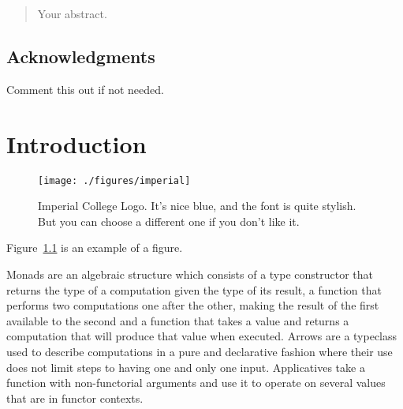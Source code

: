 \documentclass[12pt,twoside]{report}
\begin{document}



\clearpage{\pagestyle{empty}\cleardoublepage}
\setcounter{page}{1}
\pagestyle{fancy}

\begin{abstract}
Your abstract.
\end{abstract}

\cleardoublepage
\section*{Acknowledgments}
Comment this out if not needed.

\clearpage{\pagestyle{empty}\cleardoublepage}

\tableofcontents 


\clearpage{\pagestyle{empty}\cleardoublepage}
\setcounter{page}{1}
\fancyhead[LE,RO]{\slshape \rightmark}
\fancyhead[LO,RE]{\slshape \leftmark}

\chapter{Introduction}

\begin{figure}[tb]
\centering
\texttt{[image: ./figures/imperial]}
\caption{Imperial College Logo. It's nice blue, and the font is quite stylish. But you can choose a different one if you don't like it.}
\label{fig:logo}
\end{figure}

Figure~\ref{fig:logo} is an example of a figure. 

Monads are an algebraic structure which consists of a type constructor that returns the type of a computation given the type of its result, a function that performs two computations one after the other, making the result of the first available to the second and a function that takes a value and returns a computation that will produce that value when executed. Arrows are a typeclass used to describe computations in a pure and declarative fashion where their use does not limit steps to having one and only one input. Applicatives take a function with non-functorial arguments and use it to operate on several values that are in functor contexts.
\end{document}
